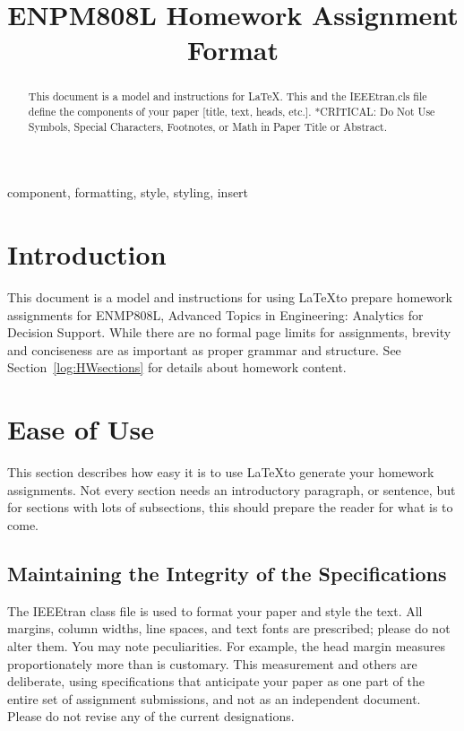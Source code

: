 \documentclass[journal]{IEEEtran}
\begin{document}
\title{ENPM808L Homework Assignment Format}

\author{
}

\maketitle

\begin{abstract}
This document is a model and instructions for \LaTeX.
This and the IEEEtran.cls file define the components of your paper [title, text, heads, etc.]. *CRITICAL: Do Not Use Symbols, Special Characters, Footnotes, or Math in Paper Title or Abstract.
\end{abstract}

\begin{IEEEkeywords}
component, formatting, style, styling, insert
\end{IEEEkeywords}

\section{Introduction}
This document is a model and instructions for using \LaTeX to prepare homework assignments for ENMP808L, Advanced Topics in Engineering: Analytics for Decision Support.
While there are no formal page limits for assignments, brevity and conciseness are as important as proper grammar and structure.
See Section~\ref{log:HWsections} for details about homework content. 

\section{Ease of Use}

This section describes how easy it is to use \LaTeX to generate your homework assignments.
Not every section needs an introductory paragraph, or sentence, but for sections with lots of subsections, this should prepare the reader for what is to come.

\subsection{Maintaining the Integrity of the Specifications}

The IEEEtran class file is used to format your paper and style the text. 
All margins, column widths, line spaces, and text fonts are prescribed; please do not alter them. 
You may note peculiarities. 
For example, the head margin measures proportionately more than is customary. 
This measurement and others are deliberate, using specifications that anticipate your paper as one part of the entire set of assignment submissions, and not as an independent document. 
Please do not revise any of the current designations.
\end{document}
